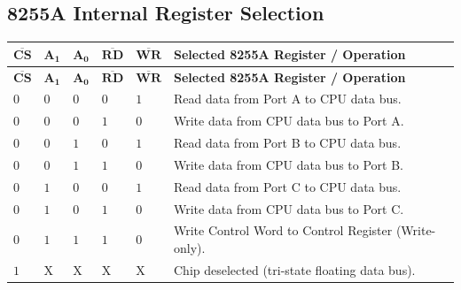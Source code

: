 \documentclass[12pt,a4paper]{article}
\begin{document}
\subsection{8255A Internal Register Selection}
\par\vspace{6pt}\noindent
\begingroup
\setlength{\extrarowheight}{2.5pt}
\begingroup
\setlength{\LTleft}{0pt}
\setlength{\LTright}{0pt}
\begin{longtable}{|B{1.6cm}|B{1.6cm}|B{1.6cm}|B{1.6cm}|B{1.6cm}|>{\small\raggedright\arraybackslash}m{\dimexpr(\linewidth-1.6cm-1.6cm-1.6cm-1.6cm-1.6cm-12\arrayrulewidth)/1\relax}|}
\hline
$\mathbf{\overline{CS}}$ & $\mathbf{A_1}$ & $\mathbf{A_0}$ & $\mathbf{\overline{RD}}$ & $\mathbf{\overline{WR}}$ & \textbf{Selected 8255A Register / Operation} \\ \hline
\endfirsthead
\hline
$\mathbf{\overline{CS}}$ & $\mathbf{A_1}$ & $\mathbf{A_0}$ & $\mathbf{\overline{RD}}$ & $\mathbf{\overline{WR}}$ & \textbf{Selected 8255A Register / Operation} \\ \hline
\endhead
$0$ & $0$ & $0$ & $0$ & $1$ & Read data from Port A to CPU data bus. \\ \hline
$0$ & $0$ & $0$ & $1$ & $0$ & Write data from CPU data bus to Port A. \\ \hline
$0$ & $0$ & $1$ & $0$ & $1$ & Read data from Port B to CPU data bus. \\ \hline
$0$ & $0$ & $1$ & $1$ & $0$ & Write data from CPU data bus to Port B. \\ \hline
$0$ & $1$ & $0$ & $0$ & $1$ & Read data from Port C to CPU data bus. \\ \hline
$0$ & $1$ & $0$ & $1$ & $0$ & Write data from CPU data bus to Port C. \\ \hline
$0$ & $1$ & $1$ & $1$ & $0$ & Write Control Word to Control Register (Write-only). \\ \hline
$1$ & $\mathrm{X}$ & $\mathrm{X}$ & $\mathrm{X}$ & $\mathrm{X}$ & Chip deselected (tri-state floating data bus). \\ \hline
\end{longtable}
\endgroup\par
\endgroup
\end{document}
